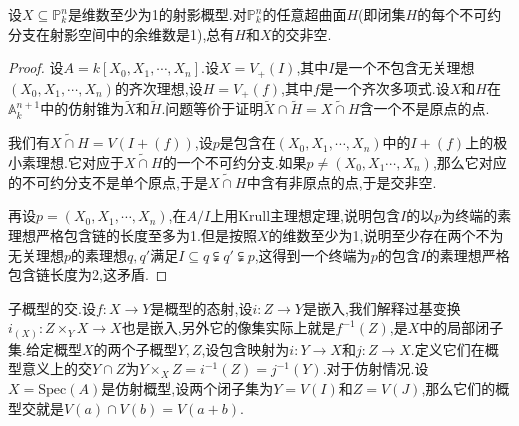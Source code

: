  设$X\subseteq\mathbb{P}_k^n$是维数至少为1的射影概型.对$\mathbb{P}_k^n$的任意超曲面$H$(即闭集$H$的每个不可约分支在射影空间中的余维数是1),总有$H$和$X$的交非空.
	\begin{proof}
		
		设$A=k[X_0,X_1,\cdots,X_n]$.设$X=V_+(I)$,其中$I$是一个不包含无关理想$(X_0,X_1,\cdots,X_n)$的齐次理想,设$H=V_+(f)$,其中$f$是一个齐次多项式.设$X$和$H$在$\mathbb{A}_k^{n+1}$中的仿射锥为$\widetilde{X}$和$\widetilde{H}$.问题等价于证明$\widetilde{X}\cap\widetilde{H}=\widetilde{X\cap H}$含一个不是原点的点.
		
		我们有$\widetilde{X\cap H}=V(I+(f))$,设$p$是包含在$(X_0,X_1,\cdots,X_n)$中的$I+(f)$上的极小素理想.它对应于$\widetilde{X\cap H}$的一个不可约分支.如果$p\not=(X_0,X_1\cdots,X_n)$,那么它对应的不可约分支不是单个原点,于是$\widetilde{X\cap H}$中含有非原点的点,于是交非空.
		
		再设$p=(X_0,X_1,\cdots,X_n)$,在$A/I$上用Krull主理想定理,说明包含$I$的以$p$为终端的素理想严格包含链的长度至多为1.但是按照$X$的维数至少为1,说明至少存在两个不为无关理想$p$的素理想$q,q'$满足$I\subseteq q\subsetneqq q'\subsetneqq p$,这得到一个终端为$p$的包含$I$的素理想严格包含链长度为2,这矛盾.
	\end{proof}
	





子概型的交.设$f:X\to Y$是概型的态射,设$i:Z\to Y$是嵌入,我们解释过基变换$i_{(X)}:Z\times_YX\to X$也是嵌入,另外它的像集实际上就是$f^{-1}(Z)$,是$X$中的局部闭子集.给定概型$X$的两个子概型$Y,Z$,设包含映射为$i:Y\to X$和$j:Z\to X$.定义它们在概型意义上的交$Y\cap Z$为$Y\times_XZ=i^{-1}(Z)=j^{-1}(Y)$.对于仿射情况.设$X=\mathrm{Spec}(A)$是仿射概型,设两个闭子集为$Y=V(I)$和$Z=V(J)$,那么它们的概型交就是$V(a)\cap V(b)=V(a+b)$.






